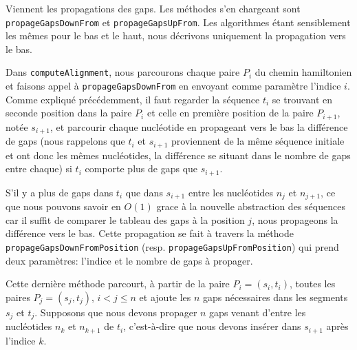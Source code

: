 Viennent les propagations des gaps.
Les méthodes s'en chargeant sont
\verb|propageGapsDownFrom| et \verb|propageGapsUpFrom|. Les algorithmes étant
sensiblement les mêmes pour le bas et le haut, nous décrivons uniquement la
propagation vers le bas.

Dans \verb|computeAlignment|, nous parcourons chaque paire $P_{i}$ du chemin
hamiltonien et faisons appel à \verb|propageGapsDownFrom| en envoyant comme
paramètre l'indice $i$. Comme expliqué précédemment, il faut regarder la
séquence $t_{i}$ se trouvant en seconde position dans la paire $P_{i}$ et celle en
première position de la paire $P_{i + 1}$, notée $s_{i + 1}$, et parcourir chaque nucléotide en
propageant vers le bas la différence de gaps (nous rappelons que $t_{i}$ et
$s_{i + 1}$ proviennent de la même séquence initiale et ont donc les mêmes
nucléotides, la différence se situant dans le nombre de gaps entre
chaque) si $t_{i}$ comporte plus de gaps que $s_{i + 1}$.

S'il y a plus de gaps dans $t_{i}$ que dans $s_{i + 1}$ entre les
nucléotides $n_{j}$ et $n_{j + 1}$, ce que nous pouvons savoir en $O(1)$ grace à
la nouvelle abstraction des séquences car il suffit de comparer le tableau des
gaps à la position $j$, nous propageons la différence vers le bas.
Cette propagation se fait à travers la méthode
\verb|propageGapsDownFromPosition| (resp. \verb|propageGapsUpFromPosition|) qui
prend deux paramètres: l'indice et le nombre de gaps à propager.

Cette dernière méthode parcourt, à partir de la paire $P_{i} = (s_{i}, t_{i})$,
toutes les paires $P_{j} = (s_{j}, t_{j})$, $i < j \leq n$ et ajoute les $n$
gaps nécessaires dans les segments $s_{j}$ et $t_{j}$. Supposons que nous devons
propager $n$ gaps venant d'entre les nucléotides $n_{k}$ et $n_{k + 1}$ de
$t_{i}$, c'est-à-dire que nous devons insérer dans $s_{i + 1}$ après l'indice
$k$.

